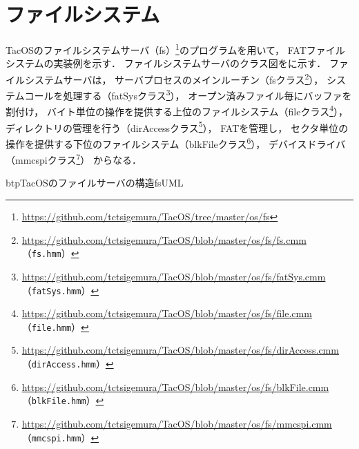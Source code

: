 \chapter{ファイルシステム}
\label{tacosFAT}

TacOSのファイルシステムサーバ（fs）\footnote{
  \url{https://github.com/tctsigemura/TacOS/tree/master/os/fs}
}のプログラムを用いて，
FATファイルシステムの実装例を示す．
ファイルシステムサーバのクラス図をに示す．
ファイルシステムサーバは，
サーバプロセスのメインルーチン（fsクラス\footnote{
  \url{https://github.com/tctsigemura/TacOS/blob/master/os/fs/fs.cmm}
  （\texttt{fs.hmm}）}），
システムコールを処理する（fatSysクラス\footnote{
  \url{https://github.com/tctsigemura/TacOS/blob/master/os/fs/fatSys.cmm}
  （\texttt{fatSys.hmm}）}），
オープン済みファイル毎にバッファを割付け，
バイト単位の操作を提供する上位のファイルシステム（fileクラス\footnote{
  \url{https://github.com/tctsigemura/TacOS/blob/master/os/fs/file.cmm}
  （\texttt{file.hmm}）}），
ディレクトリの管理を行う（dirAccessクラス\footnote{
  \url{https://github.com/tctsigemura/TacOS/blob/master/os/fs/dirAccess.cmm}
  （\texttt{dirAccess.hmm}）}），
FATを管理し，
セクタ単位の操作を提供する下位のファイルシステム（blkFileクラス\footnote{
  \url{https://github.com/tctsigemura/TacOS/blob/master/os/fs/blkFile.cmm}
  （\texttt{blkFile.hmm}）}），
デバイスドライバ（mmcspiクラス\footnote{
  \url{https://github.com/tctsigemura/TacOS/blob/master/os/fs/mmcspi.cmm}
  （\texttt{mmcspi.hmm}）}）
からなる．

\begin{myfig}{btp}{TacOSのファイルサーバの構造}{fsUML}
\end{myfig}

